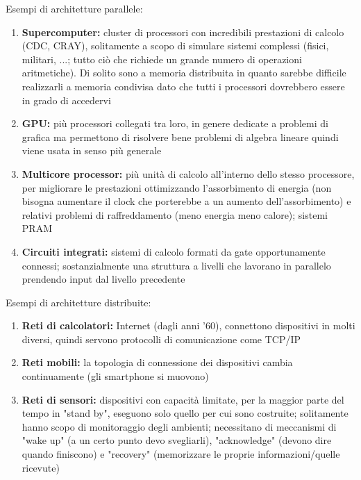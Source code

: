\documentclass[11pt]{article}
\begin{document}
	Esempi di architetture parallele: 
	\begin{enumerate}
		\item \textbf{Supercomputer:} cluster di processori con incredibili prestazioni di calcolo (CDC, CRAY), solitamente a scopo di simulare sistemi complessi (fisici, militari, ...; tutto ciò che richiede un grande numero di operazioni aritmetiche). Di solito sono a memoria distribuita in quanto sarebbe difficile realizzarli a memoria condivisa dato che tutti i processori dovrebbero essere in grado di accedervi
		
		\item \textbf{GPU:} più processori collegati tra loro, in genere dedicate a problemi di grafica ma permettono di risolvere bene problemi di algebra lineare quindi viene usata in senso più generale
		
		\item \textbf{Multicore processor:} più unità di calcolo all'interno dello stesso processore, per migliorare le prestazioni ottimizzando l'assorbimento di energia (non bisogna aumentare il clock che porterebbe a un aumento dell'assorbimento) e relativi problemi di raffreddamento (meno energia meno calore); sistemi PRAM
		
		\item \textbf{Circuiti integrati:} sistemi di calcolo formati da gate opportunamente connessi; sostanzialmente una struttura a livelli che lavorano in parallelo prendendo input dal livello precedente
	\end{enumerate}

	Esempi di architetture distribuite:
	\begin{enumerate}
		\item \textbf{Reti di calcolatori:} Internet (dagli anni '60), connettono dispositivi in molti diversi, quindi servono protocolli di comunicazione come TCP/IP
		
		\item \textbf{Reti mobili:} la topologia di connessione dei dispositivi cambia continuamente (gli smartphone si muovono)
		
		\item \textbf{Reti di sensori:} dispositivi con capacità limitate, per la maggior parte del tempo in "stand by", eseguono solo quello per cui sono costruite; solitamente hanno scopo di monitoraggio degli ambienti; necessitano di meccanismi di "wake up" (a un certo punto devo svegliarli), "acknowledge" (devono dire quando finiscono) e "recovery" (memorizzare le proprie informazioni/quelle ricevute)
	\end{enumerate}
\end{document}
